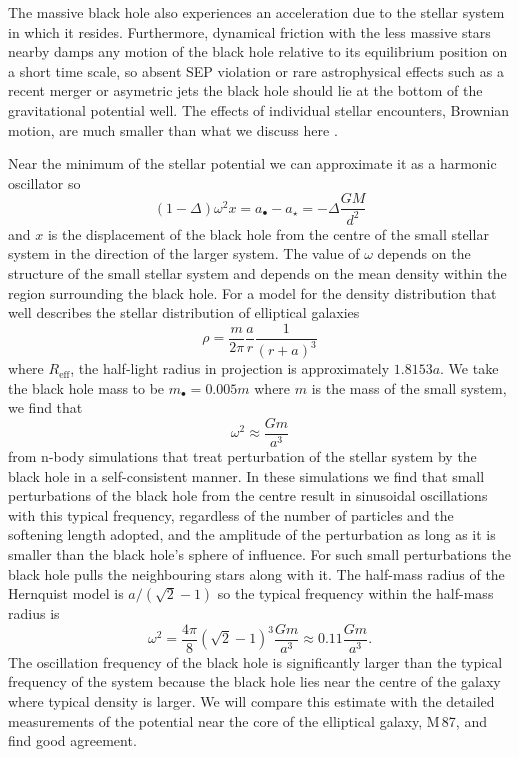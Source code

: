 \documentclass[useAMS,usenatbib]{mn2e}
\begin{document}
The massive black hole also experiences an acceleration due to the
stellar system in which it resides.  Furthermore, dynamical friction
with the less massive stars nearby damps any motion of the black hole
relative to its equilibrium position on a short time scale, so absent
SEP violation or rare astrophysical effects such as a recent merger or
asymetric jets the black hole should lie at the bottom of the
gravitational potential well.  The effects of individual stellar
encounters, Brownian motion, are much smaller than what we discuss
here \citep{2011ApJ...735...57B}.

Near the minimum of the stellar potential we can approximate it as a
harmonic oscillator so
\begin{equation}
  \left (1 - \Delta \right) \omega^2 x
   = a_\bullet - a_\star = -\Delta \frac{GM}{d^2}
  \label{eq:3}
\end{equation}
and $x$ is the displacement of the black hole from the centre of the
small stellar system in the direction of the larger system.  The value
of $\omega$ depends on the structure of the small stellar system and
depends on the mean density within the region surrounding the black
hole.  For a \citet{1990ApJ...356..359H} model
for the density distribution that well describes the stellar
distribution of elliptical galaxies
\begin{equation}
  \rho = \frac{m}{2\pi} \frac{a}{r} \frac{1}{(r+a)^3}
  \label{eq:4}
\end{equation}
where $R_\mathrm{eff}$, the half-light radius in projection is
approximately $1.8153 a$.  We take the black hole mass to be
$m_\bullet = 0.005 m$ where $m$ is the mass of the small system, we
find that
\begin{equation}
  \omega^2 \approx \frac{Gm}{a^3}
  \label{eq:5}
\end{equation}
from n-body simulations that treat perturbation of the stellar system
by the black hole in a self-consistent manner. In these simulations we
find that small perturbations of the black hole from the centre result
in sinusoidal oscillations with this typical frequency, regardless of
the number of particles and the softening length adopted, and the
amplitude of the perturbation as long as it is smaller than the black
hole's sphere of influence.  For such small perturbations the black
hole pulls the neighbouring stars along with it. The half-mass radius
of the Hernquist model is $a/(\sqrt{2}-1)$ so the typical frequency
within the half-mass radius is
\begin{equation}
  \omega^2 = \frac{4\pi}{8} (\sqrt{2}-1)^3 \frac{G m}{a^3} \approx
  0.11 \frac{Gm}{a^3}.
  \label{eq:6}
\end{equation}
The oscillation frequency of the black hole is significantly larger
than the typical frequency of the system because the black hole lies
near the centre of the galaxy where typical density is larger. 
We will compare this estimate with the detailed
measurements of the potential near the core of the elliptical galaxy,
M\,87, and find good agreement.
\end{document}
